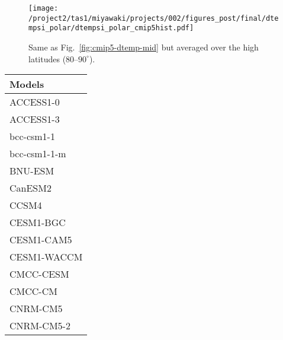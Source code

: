\documentclass{ametsocV5}
\begin{document}
\begin{figure}
  \centering
  \noindent\texttt{[image: /project2/tas1/miyawaki/projects/002/figures\_post/final/dtempsi\_polar/dtempsi\_polar\_cmip5hist.pdf]}\\
  \caption{Same as Fig.~\ref{fig:cmip5-dtemp-mid} but averaged over the high latitudes ($80$--$90^{\circ}$).}
  \label{fig:cmip5-dtemp-polar}
\end{figure}


\begin{table}[t]
\begin{center}
  \renewcommand{\arraystretch}{1.0}
  \begin{tabular}{ l }
    Models          \\%
    \hline
    ACCESS1-0       \\%
    ACCESS1-3       \\%
    bcc-csm1-1      \\%
    bcc-csm1-1-m    \\%
    BNU-ESM         \\%
    CanESM2         \\%
    CCSM4           \\%
    CESM1-BGC       \\%
    CESM1-CAM5      \\%
    CESM1-WACCM     \\%
    CMCC-CESM       \\%
    CMCC-CM         \\%
    CNRM-CM5        \\%
    CNRM-CM5-2      \\%

\end{tabular}
\end{center}
\end{table}
\end{document}
